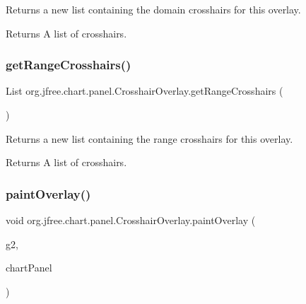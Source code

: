 Returns a new list containing the domain crosshairs for this overlay.

\begin{DoxyReturn}{Returns}
A list of crosshairs. 
\end{DoxyReturn}
\mbox{\label{classorg_1_1jfree_1_1chart_1_1panel_1_1_crosshair_overlay_a131a59a3bf5b5f8b8492d7935ab07077}} 
\subsubsection{\texorpdfstring{get\+Range\+Crosshairs()}{getRangeCrosshairs()}}
{\footnotesize\ttfamily List org.\+jfree.\+chart.\+panel.\+Crosshair\+Overlay.\+get\+Range\+Crosshairs (\begin{DoxyParamCaption}{ }\end{DoxyParamCaption})}

Returns a new list containing the range crosshairs for this overlay.

\begin{DoxyReturn}{Returns}
A list of crosshairs. 
\end{DoxyReturn}
\mbox{\label{classorg_1_1jfree_1_1chart_1_1panel_1_1_crosshair_overlay_a1601884f0d667eab61c224336dc87145}} 
\subsubsection{\texorpdfstring{paint\+Overlay()}{paintOverlay()}}
{\footnotesize\ttfamily void org.\+jfree.\+chart.\+panel.\+Crosshair\+Overlay.\+paint\+Overlay (\begin{DoxyParamCaption}\item[{Graphics2D}]{g2,  }\item[{\mbox{\hyperlink{classorg_1_1jfree_1_1chart_1_1_chart_panel}{Chart\+Panel}}}]{chart\+Panel }\end{DoxyParamCaption})}

